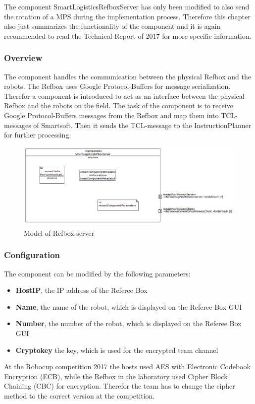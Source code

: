 The component SmartLogisticsRefboxServer has only been modified to also send the rotation of a MPS during the implementation process.
Therefore this chapter also just summarizes the functionality of the component and it is again recommended to read the Technical Report of 2017 for more specific information.

\subsubsection{Overview}

The component handles the communication between the physical Refbox and the robots. The Refbox uses Google Protocol-Buffers for message serialization. Therefor a component is introduced to act as an interface between the physical Refbox and the robots on the field. The task of the component is to receive Google Protocol-Buffers messages from the Refbox and map them into TCL-messages of Smartsoft. Then it sends the TCL-message to the InstructionPlanner for further processing.

\begin{figure}[!h]
\centering
\includegraphics[width=\linewidth]{pic/component_refbox_server.png}
\caption{Model of Refbox server}
\label{fig:modelRefboxServer}
\end{figure}


\subsubsection{Configuration}

The component can be modified by the following parameters:
\begin{itemize}
\item \textbf{HostIP}, the IP address of the Referee Box
\item \textbf{Name}, the name of the robot, which is displayed on the Referee Box GUI
\item \textbf{Number}, the number of the robot, which is displayed on the Referee Box GUI
\item \textbf{Cryptokey} the key, which is used for the encrypted team channel
\end{itemize}

At the Robocup competition 2017 the hosts used AES with Electronic Codebook Encryption (ECB), while the Refbox in the laboratory used Cipher Block Chaining (CBC) for encryption. Therefor the team has to change the cipher method to the correct version at the competition.
